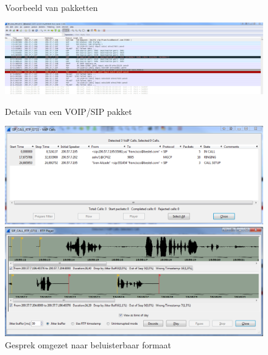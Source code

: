 \documentclass[pdftex,a4paper,12pt,twoside]{report}
\begin{document}
\begin{figure}[H]
\caption{Voorbeeld van pakketten}
\includegraphics[scale=0.3]{img/sniffer1}
\caption{Details van een VOIP/SIP pakket}
\includegraphics[scale=0.5]{img/sniffer2}
\caption{Gesprek omgezet naar beluisterbaar formaat}
\includegraphics[scale=0.5]{img/sniffer3}
\end{figure}
\end{document}
